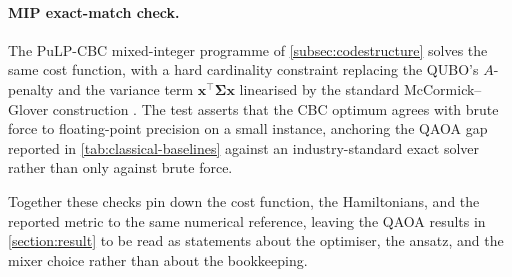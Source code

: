 \paragraph{MIP exact-match check.} The PuLP-CBC mixed-integer programme of \cref{subsec:codestructure} solves the same cost function, with a hard cardinality constraint replacing the QUBO's $A$-penalty and the variance term $\boldsymbol x^\top\boldsymbol\Sigma\boldsymbol x$ linearised by the standard McCormick--Glover construction \parencite{glover1975integerprog}. The test asserts that the CBC optimum agrees with brute force to floating-point precision on a small instance, anchoring the QAOA gap reported in \cref{tab:classical-baselines} against an industry-standard exact solver rather than only against brute force.

Together these checks pin down the cost function, the Hamiltonians, and the reported metric to the same numerical reference, leaving the QAOA results in \cref{section:result} to be read as statements about the optimiser, the ansatz, and the mixer choice rather than about the bookkeeping.
